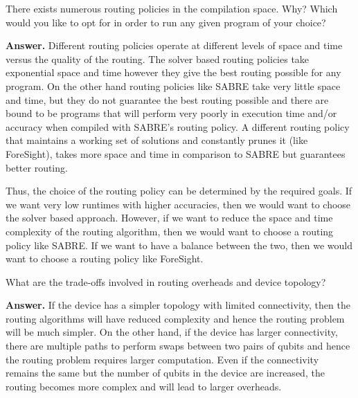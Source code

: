 \tcbline{}

\begin{question}
    There exists numerous routing policies in the compilation space. Why? Which would you like to opt for in order to run any given program of your choice?
\end{question}
\textbf{Answer.} Different routing policies operate at different levels of space and time versus the quality of the routing. The solver based routing policies take exponential space and time however they give the best routing possible for any program. On the other hand routing policies like SABRE take very little space and time, but they do not guarantee the best routing possible and there are bound to be programs that will perform very poorly in execution time and/or accuracy when compiled with SABRE's routing policy. A different routing policy that maintains a working set of solutions and constantly prunes it (like ForeSight), takes more space and time in comparison to SABRE but guarantees better routing.\par
Thus, the choice of the routing policy can be determined by the required goals. If we want very low runtimes with higher accuracies, then we would want to choose the solver based approach. However, if we want to reduce the space and time complexity of the routing algorithm, then we would want to choose a routing policy like SABRE. If we want to have a balance between the two, then we would want to choose a routing policy like ForeSight.

\tcbline{}

\begin{question}
    What are the trade-offs involved in routing overheads and device topology?
\end{question}
\textbf{Answer.} If the device has a simpler topology with limited connectivity, then the routing algorithms will have reduced complexity and hence the routing problem will be much simpler. On the other hand, if the device has larger connectivity, there are multiple paths to perform swaps between two pairs of qubits and hence the routing problem requires larger computation. Even if the connectivity remains the same but the number of qubits in the device are increased, the routing becomes more complex and will lead to larger overheads.